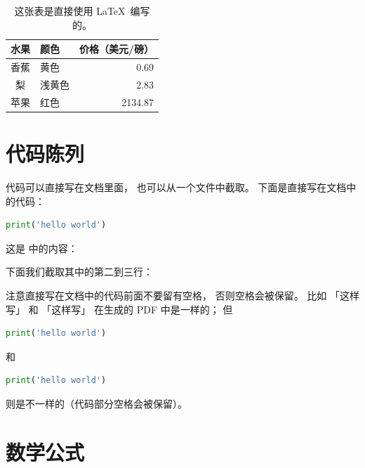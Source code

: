 \documentclass{article}
\newcommand*\botrule{\bottomrule}
\begin{document}
\begin{table}[htpb]
    \centering
    \caption{%
        这张表是直接使用 \LaTeX\ 编写的。
    }
    \label{tab:latextab}
    \begin{tabular}{clr} %
        \toprule
        水果 & 颜色   & 价格（美元/磅） \\
        \midrule
        香蕉 & 黄色   & 0.69            \\
        梨   & 浅黄色 & 2.83            \\
        苹果 & 红色   & 2134.87         \\
        \botrule
    \end{tabular}
\end{table}

\section{代码陈列}

代码可以直接写在文档里面，
也可以从一个文件中截取。
下面是直接写在文档中的代码：
\begin{lstlisting}[language=python]
print('hello world')
\end{lstlisting}
这是  中的内容：

下面我们截取其中的第二到三行：


注意直接写在文档中的代码前面不要留有空格，
否则空格会被保留。
比如
「这样写」
和
                                    「这样写」
在生成的 PDF 中是一样的；
但
\begin{lstlisting}[language=python]
print('hello world')
\end{lstlisting}
和
    \begin{lstlisting}[language=python]
    print('hello world')
    \end{lstlisting}
则是不一样的（代码部分空格会被保留）。


\section{数学公式}
\end{document}
